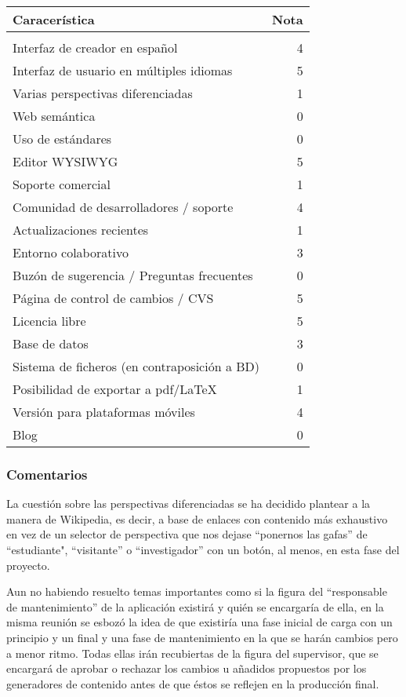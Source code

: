 \begin{tabular}{l @{\hspace{10px}} r}
Caracerística & Nota \\
\hline \\
Interfaz de creador en español & 4 \\
Interfaz de usuario en múltiples idiomas & 5 \\	
Varias perspectivas diferenciadas & 1 \\
Web semántica & 0 \\
Uso de estándares & 0 \\
Editor WYSIWYG & 5 \\
Soporte comercial & 1 \\
Comunidad de desarrolladores / soporte & 4 \\
Actualizaciones recientes & 1 \\
Entorno colaborativo & 3 \\
Buzón de sugerencia / Preguntas frecuentes & 0 \\
Página de control de cambios / CVS & 5 \\
Licencia libre & 5 \\
Base de datos & 3 \\
Sistema de ficheros (en contraposición a BD) & 0 \\
Posibilidad de exportar a pdf/LaTeX & 1 \\
Versión para plataformas móviles & 4 \\
Blog & 0 \\
\end{tabular}

\subsubsection{Comentarios}

\par La cuestión sobre las perspectivas diferenciadas se ha decidido plantear a la manera de Wikipedia, es decir, a base de enlaces con contenido más exhaustivo en vez de un selector de perspectiva que nos dejase ``ponernos las gafas'' de ``estudiante", ``visitante'' o ``investigador'' con un botón, al menos, en esta fase del proyecto.

\par Aun no habiendo resuelto temas importantes como si la figura del ``responsable de mantenimiento'' de la aplicación existirá y quién se encargaría de ella, en la misma reunión se esbozó la idea de que existiría una fase inicial de carga con un principio y un final y una fase de mantenimiento en la que se harán cambios pero a menor ritmo. Todas ellas irán recubiertas de la figura del supervisor, que se encargará de aprobar o rechazar los cambios u añadidos propuestos por los generadores de contenido antes de que éstos se reflejen en la producción final.

